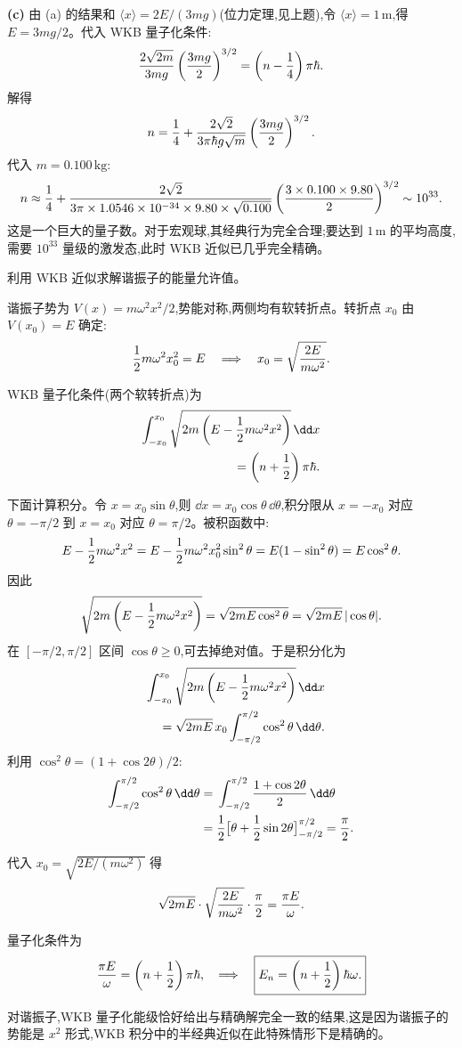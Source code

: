 \begin{question}
\begin{solution}
\textbf{(c)} 由 (a) 的结果和 $\langle x\rangle=2E/(3mg)$(位力定理,见上题),令 $\langle x\rangle=1\,\mathrm{m}$,得 $E=3mg/2$。代入 WKB 量子化条件:
\[
{2\sqrt{2m}\over3mg}\left({3mg\over2}\right)^{3/2}
=\left(n-{1\over4}\right)\pi\hbar.
\]
解得
\[
n={1\over4}+{2\sqrt{2}\over3\pi\hbar g\sqrt m}\left({3mg\over2}\right)^{3/2}.
\]
代入 $m=0.100\,\mathrm{kg}$:
\[
n\approx{1\over4}+{2\sqrt2\over3\pi\times1.0546\times10^{-34}\times9.80\times\sqrt{0.100}}
\left({3\times0.100\times9.80\over2}\right)^{3/2}\sim 10^{33}.
\]
这是一个巨大的量子数。对于宏观球,其经典行为完全合理;要达到 $1\,\mathrm{m}$ 的平均高度,需要 $10^{33}$ 量级的激发态,此时 WKB 近似已几乎完全精确。
\end{solution}
\end{question}

\begin{question}
利用 WKB 近似求解谐振子的能量允许值。
\begin{solution}
谐振子势为 $V(x)=m\omega^2x^2/2$,势能对称,两侧均有软转折点。转折点 $x_0$ 由 $V(x_0)=E$ 确定:
\[
{1\over2}m\omega^2x_0^2=E\quad\Longrightarrow\quad
x_0=\sqrt{2E\over m\omega^2}.
\]

WKB 量子化条件(两个软转折点)为
\[
\begin{aligned}\int_{-x_0}^{x_0}\sqrt{2m\left(E-{1\over2}m\omega^2x^2\right)}\,\dd x\\\qquad=\left(n+{1\over2}\right)\pi\hbar.\end{aligned}
\]

下面计算积分。令 $x=x_0\sin\theta$,则 $\dd x=x_0\cos\theta\,\dd\theta$,积分限从 $x=-x_0$ 对应 $\theta=-\pi/2$ 到 $x=x_0$ 对应 $\theta=\pi/2$。被积函数中:
\[
E-{1\over2}m\omega^2x^2
=E-{1\over2}m\omega^2x_0^2\sin^2\theta
=E(1-\sin^2\theta)=E\cos^2\theta.
\]
因此
\[
\sqrt{2m\left(E-{1\over2}m\omega^2x^2\right)}
=\sqrt{2mE\cos^2\theta}=\sqrt{2mE}\,|\cos\theta|.
\]
在 $[-\pi/2,\pi/2]$ 区间 $\cos\theta\ge0$,可去掉绝对值。于是积分化为
\[
\begin{aligned}\int_{-x_0}^{x_0}\sqrt{2m\left(E-{1\over2}m\omega^2x^2\right)}\,\dd x\\\qquad=\sqrt{2mE}\,x_0\int_{-\pi/2}^{\pi/2}\cos^2\theta\,\dd\theta.\end{aligned}
\]
利用 $\cos^2\theta=(1+\cos2\theta)/2$:
\[
\begin{aligned}\int_{-\pi/2}^{\pi/2}\cos^2\theta\,\dd\theta={}&\int_{-\pi/2}^{\pi/2}{1+\cos2\theta\over2}\,\dd\theta\\={}&{1\over2}\bigl[\theta+{1\over2}\sin2\theta\bigr]_{-\pi/2}^{\pi/2}={\pi\over2}.\end{aligned}
\]

代入 $x_0=\sqrt{2E/(m\omega^2)}$ 得
\[
\sqrt{2mE}\cdot\sqrt{2E\over m\omega^2}\cdot{\pi\over2}={\pi E\over\omega}.
\]

量子化条件为
\[
{\pi E\over\omega}=\left(n+{1\over2}\right)\pi\hbar,
\quad\Longrightarrow\quad
\boxed{E_n=\left(n+{1\over2}\right)\hbar\omega.}
\]

对谐振子,WKB 量子化能级恰好给出与精确解完全一致的结果,这是因为谐振子的势能是 $x^2$ 形式,WKB 积分中的半经典近似在此特殊情形下是精确的。
\end{solution}
\end{question}

